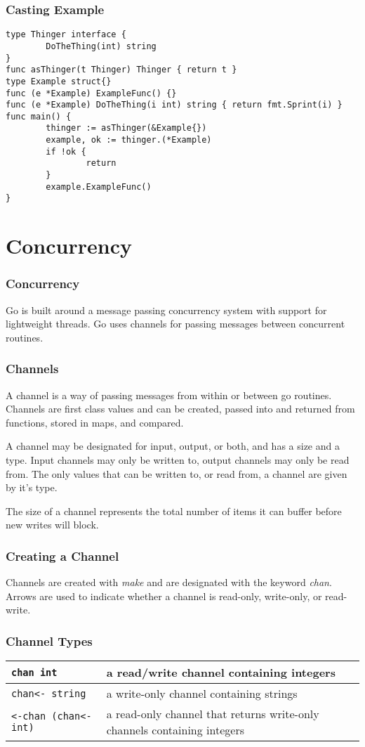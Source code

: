 \documentclass{beamer}
\begin{document}
\begin{frame}[fragile]
  \frametitle{Casting Example}
\begin{lstlisting}[language=Golang]
type Thinger interface {
        DoTheThing(int) string
}
func asThinger(t Thinger) Thinger { return t }
type Example struct{}
func (e *Example) ExampleFunc() {}
func (e *Example) DoTheThing(i int) string { return fmt.Sprint(i) }
func main() {
        thinger := asThinger(&Example{})
        example, ok := thinger.(*Example)
        if !ok {
                return
        }
        example.ExampleFunc()
}
\end{lstlisting}
\end{frame}

\section{Concurrency}

\begin{frame}
  \frametitle{Concurrency}
  Go is built around a message passing concurrency system with support
  for lightweight threads.  Go uses channels for passing messages
  between concurrent routines.
\end{frame}

\begin{frame}
  \frametitle{Channels}
  A channel is a way of passing messages from within or between go
  routines.  Channels are first class values and can be created,
  passed into and returned from functions, stored in maps, and
  compared.

  A channel may be designated for input, output, or both, and has a
  size and a type.  Input channels may only be written to, output
  channels may only be read from.  The only values that can be written
  to, or read from, a channel are given by it's type.

  The size of a channel represents the total number of items it can
  buffer before new writes will block.
\end{frame}

\begin{frame}[fragile]
  \frametitle{Creating a Channel}
  Channels are created with \emph{make} and are designated with the
  keyword \emph{chan}.  Arrows are used to indicate whether a channel
  is read-only, write-only, or read-write.
\end{frame}

\begin{frame}[fragile]
  \frametitle{Channel Types}
  \begin{tabular}{|p{2in}|p{1.5in}|}
    \hline
    \verb!chan int! & a read/write channel containing integers \\
    \hline
    \verb!chan<- string! & a write-only channel containing strings \\
    \hline
    \verb!<-chan (chan<- int)! & a read-only channel that returns write-only channels containing integers \\
    \hline
  \end{tabular}
\end{frame}
\end{document}
